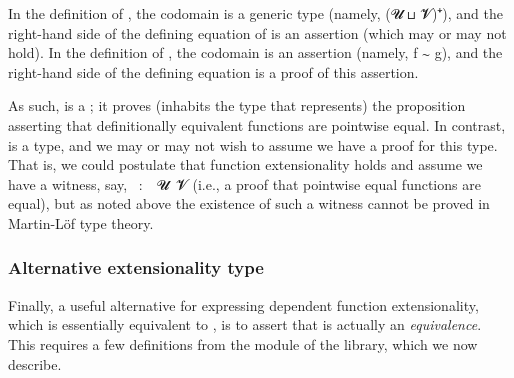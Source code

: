 In the definition of , the codomain is a generic type (namely, (\ab 𝓤 \ap ⊔ \ab 𝓥)\af ⁺\af ̇), and the right-hand side of the defining equation of  is an assertion (which may or may not hold). In the definition of , the codomain is an assertion (namely, \ab f \af ∼ \ab g), and the right-hand side of the defining equation is a proof of this assertion.

As such,  is a ; it proves (inhabits the type that represents) the proposition asserting that definitionally equivalent functions are pointwise equal. In contrast,  is a type, and we may or may not wish to assume we have a proof for this type. That is, we could postulate that function extensionality holds and assume we have a witness, say, ~\as :~~\ab 𝓤~\ab 𝓥 (i.e., a proof that pointwise equal functions are equal), but as noted above the existence of such a witness cannot be proved in Martin-Löf type theory.

\subsubsection{Alternative extensionality type}\label{alternative-extensionality-type}

Finally, a useful alternative for expressing dependent function extensionality, which is essentially equivalent to , is to assert that  is actually an \emph{equivalence}. This requires a few definitions from the  module of the \typetopology library, which we now describe.

